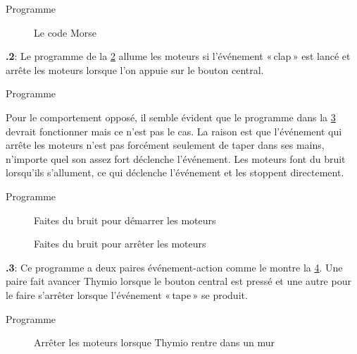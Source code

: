 \documentclass[12pt,a4paper,french]{article}
\begin{document}
{\raggedleft \hfill Programme }

\begin{figure}
\begin{center}
\caption{Le code Morse}\label{fig.morse}
\end{center}
\end{figure}


\textbf{\thesection.2}: Le programme de la \cref{fig.clap-to-start} allume les moteurs si l'événement «\,clap\,» est lancé et arrête les moteurs lorsque l'on appuie sur le bouton central.

{\raggedleft \hfill Programme }

Pour le comportement opposé, il semble évident que le programme dans la \cref{fig.clap-to-stop} devrait fonctionner mais ce n'est pas le cas. La raison est que l'événement qui arrête les moteurs n'est pas forcément seulement de taper dans ses mains, n'importe quel son assez fort déclenche l'événement. Les moteurs font du bruit lorsqu'ils s'allument, ce qui déclenche l'événement et les stoppent directement.

{\raggedleft \hfill Programme }

\begin{figure}
\begin{center}
\caption{Faites du bruit pour démarrer les moteurs}\label{fig.clap-to-start}
\end{center}
\end{figure}

\begin{figure}[hbt]
\begin{center}
\caption{Faites du bruit pour arrêter les moteurs}\label{fig.clap-to-stop}
\end{center}
\end{figure}

\textbf{\thesection.3}:
Ce programme a deux paires événement-action comme le montre la \cref{fig.bump}. Une paire fait avancer Thymio lorsque le bouton central est pressé et une autre pour le faire s'arrêter lorsque l'événement «\,tape\,» se produit.

{\raggedleft \hfill Programme }

\begin{figure}[hbt]
\begin{center}
\caption{Arrêter les moteurs lorsque Thymio rentre dans un mur}\label{fig.bump}
\end{center}
\end{figure}
\end{document}
